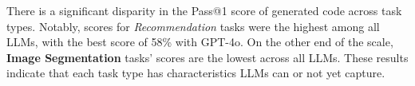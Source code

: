 There is a significant disparity in the Pass@1 score of generated code across task types. Notably, scores for \textit{Recommendation} tasks were the highest among all LLMs, with the best score of 58\% with GPT-4o. On the other end of the scale, \textbf{Image Segmentation} tasks' scores are the lowest across all LLMs. These results indicate that each task type has characteristics LLMs can or not yet capture.





